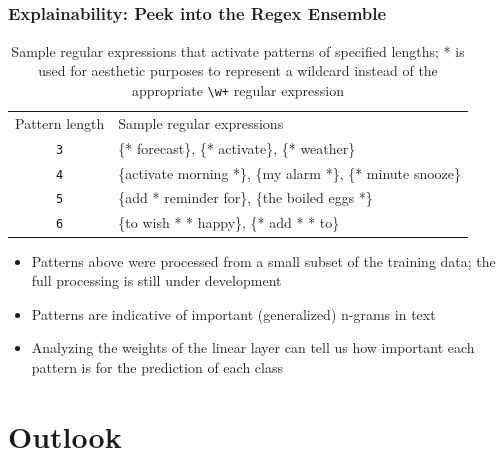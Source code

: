 \documentclass[10pt]{beamer}
\begin{document}
\subsection{}
\begin{frame}
  \frametitle{Explainability: Peek into the Regex Ensemble}
  \begin{table}[]
    \begin{tabular}{|c|l|}
      \cline{1-2}
      Pattern length & Sample regular expressions \\ \hhline{|=|=|}
      \texttt{3} & \{* forecast\}, \{* activate\}, \{* weather\} \\ \cline{1-2}
      \texttt{4} & \{activate morning *\}, \{my alarm *\}, \{* minute snooze\} \\ \cline{1-2}
      \texttt{5} & \{add * reminder for\}, \{the boiled eggs *\} \\ \cline{1-2}
      \texttt{6} & \{to wish * * happy\}, \{* add * * to\} \\ \cline{1-2}
    \end{tabular}
    \caption{Sample regular expressions that activate patterns of specified lengths; * is used for aesthetic purposes to represent a wildcard instead of the appropriate \texttt{\textbackslash{}w+} regular expression}
  \end{table}
  \begin{itemize} 
    \item Patterns above were processed from a small subset of the training data; the full processing is still under development
    \item Patterns are indicative of important (generalized) n-grams in text
    \item Analyzing the weights of the linear layer can tell us how important each pattern is for the prediction of each class
  \end{itemize} 
\end{frame} 

\section{Outlook}
\end{document}

